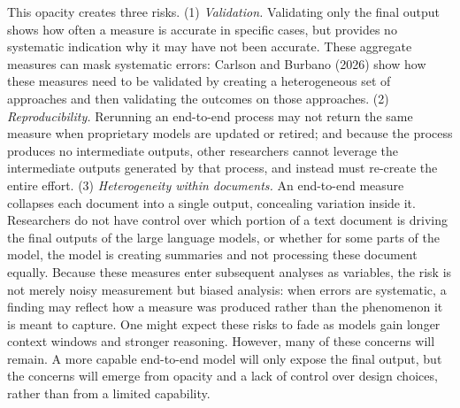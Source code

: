 \documentclass[11pt]{article}
\begin{document}
This opacity creates three risks. (1) \textit{Validation.} Validating only the final output shows how often a measure is accurate in specific cases, but provides no systematic indication why it may have not been accurate. These aggregate measures can mask systematic errors: Carlson and Burbano (2026) show how these measures need to be validated by creating a heterogeneous set of approaches and then validating the outcomes on those approaches. (2) \textit{Reproducibility.} Rerunning an end-to-end process may not return the same measure when proprietary models are updated or retired; and because the process produces no intermediate outputs, other researchers cannot leverage the intermediate outputs generated by that process, and instead must re-create the entire effort. (3) \textit{Heterogeneity within documents.} An end-to-end measure collapses each document into a single output, concealing variation inside it. Researchers do not have control over which portion of a text document is driving the final outputs of the large language models, or whether for some parts of the model, the model is creating summaries and not processing these document equally. Because these measures enter subsequent analyses as variables, the risk is not merely noisy measurement but biased analysis: when errors are systematic, a finding may reflect how a measure was produced rather than the phenomenon it is meant to capture. One might expect these risks to fade as models gain longer context windows and stronger reasoning. However, many of these concerns will remain. A more capable end-to-end model will only expose the final output, but the concerns will emerge from opacity and a lack of control over design choices, rather than from a limited capability.
\end{document}
